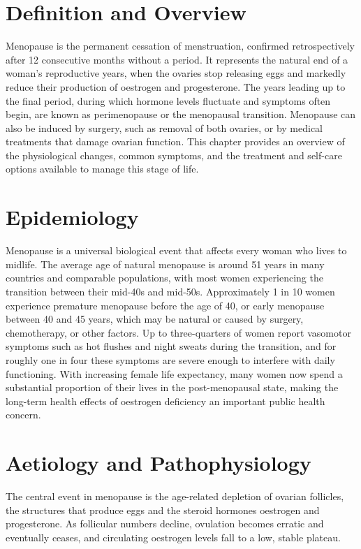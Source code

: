 \section*{Definition and Overview}
Menopause is the permanent cessation of menstruation, confirmed retrospectively after 12 consecutive months without a period. It represents the natural end of a woman's reproductive years, when the ovaries stop releasing eggs and markedly reduce their production of oestrogen and progesterone. The years leading up to the final period, during which hormone levels fluctuate and symptoms often begin, are known as perimenopause or the menopausal transition. Menopause can also be induced by surgery, such as removal of both ovaries, or by medical treatments that damage ovarian function. This chapter provides an overview of the physiological changes, common symptoms, and the treatment and self-care options available to manage this stage of life.

\section*{Epidemiology}
Menopause is a universal biological event that affects every woman who lives to midlife. The average age of natural menopause is around 51 years in many countries and comparable populations, with most women experiencing the transition between their mid-40s and mid-50s. Approximately 1 in 10 women experience premature menopause before the age of 40, or early menopause between 40 and 45 years, which may be natural or caused by surgery, chemotherapy, or other factors. Up to three-quarters of women report vasomotor symptoms such as hot flushes and night sweats during the transition, and for roughly one in four these symptoms are severe enough to interfere with daily functioning. With increasing female life expectancy, many women now spend a substantial proportion of their lives in the post-menopausal state, making the long-term health effects of oestrogen deficiency an important public health concern.

\section*{Aetiology and Pathophysiology}
The central event in menopause is the age-related depletion of ovarian follicles, the structures that produce eggs and the steroid hormones oestrogen and progesterone. As follicular numbers decline, ovulation becomes erratic and eventually ceases, and circulating oestrogen levels fall to a low, stable plateau.

